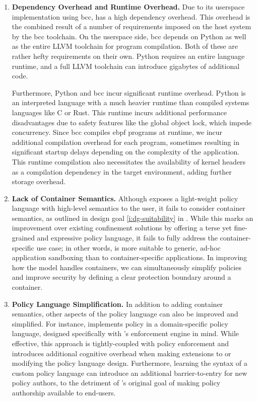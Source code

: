 \begin{enumerate}
  \item \textbf{Dependency Overhead and Runtime Overhead.}
    Due to its userspace implementation using bcc, \bpfbox{} has a high dependency
    overhead. This overhead is the combined result of a number of requirements imposed on
    the host system by the bcc toolchain. On the userspace side, bcc depends on Python as
    well as the entire LLVM toolchain for program compilation. Both of these are rather
    hefty requirements on their own. Python requires an entire language runtime, and
    a full LLVM toolchain can introduce gigabytes of additional code.

    Furthermore, Python and bcc incur significant runtime overhead. Python is an
    interpreted language with a much heavier runtime than compiled systems languages like
    C or Rust.  This runtime incurs additional performance disadvantages due to safety
    features like the global object lock, which impede concurrency. Since bcc compiles
    \gls{ebpf} programs at runtime, we incur additional compilation overhead for each
    program, sometimes resulting in significant startup delays depending on the complexity
    of the application. This runtime compilation also necessitates the availability of
    kernel headers as a compilation dependency in the target environment, adding further
    storage overhead.

  \item \textbf{Lack of Container Semantics.}
    Although \bpfbox{} exposes a light-weight policy language with high-level semantics to
    the user, it fails to consider container semantics, as outlined in design goal
    \ref{i:dg-suitability} in . While this marks an improvement over
    existing confinement solutions by offering a terse yet fine-grained and expressive
    policy language, it fails to fully address the container-specific use case; in other
    words, \bpfbox{} is more suitable to generic, ad-hoc application sandboxing than to
    container-specific applications. In improving how the \bpfbox{} model handles
    containers, we can simultaneously simplify policies and improve security by defining
    a clear protection boundary around a container.

  \item \textbf{Policy Language Simplification.}
    In addition to adding container semantics, other aspects of the \bpfbox{} policy
    language can also be improved and simplified. For instance, \bpfbox{} implements
    policy in a domain-specific policy language, designed specifically with \bpfbox{}'s
    enforcement engine in mind. While effective, this approach is tightly-coupled with
    policy enforcement and introduces additional cognitive overhead when making extensions
    to or modifying the policy language design. Furthermore, learning the syntax of
    a custom policy language can introduce an additional barrier-to-entry for new policy
    authors, to the detriment of \bpfbox{}'s original goal of making policy authorship
    available to end-users.
\end{enumerate}


